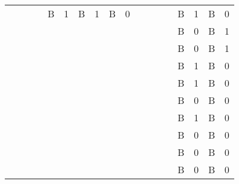 \documentclass{article}
\begin{document}
\begin{table}
\begin{tabular}{c  c  c  c  c  c  c  c  c  c  c  c  c  c  c  c  c  c}
 &  &  &  & B & 1 & B & 1 & B & 0 &  &  &  &  & B & 1 & B & 0\\
 &  &  &  &  &  &  &  &  &  &  &  &  &  & B & 0 & B & 1\\
 &  &  &  &  &  &  &  &  &  &  &  &  &  & B & 0 & B & 1\\
 &  &  &  &  &  &  &  &  &  &  &  &  &  & B & 1 & B & 0\\
 &  &  &  &  &  &  &  &  &  &  &  &  &  & B & 1 & B & 0\\
 &  &  &  &  &  &  &  &  &  &  &  &  &  & B & 0 & B & 0\\
 &  &  &  &  &  &  &  &  &  &  &  &  &  & B & 1 & B & 0\\
 &  &  &  &  &  &  &  &  &  &  &  &  &  & B & 0 & B & 0\\
 &  &  &  &  &  &  &  &  &  &  &  &  &  & B & 0 & B & 0\\
 &  &  &  &  &  &  &  &  &  &  &  &  &  & B & 0 & B & 0\\


\end{tabular}


\end{table}
\end{document}
